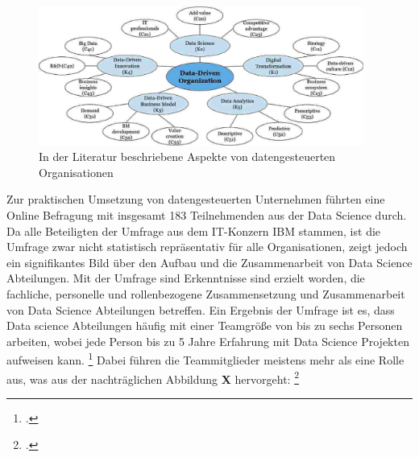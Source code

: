 \begin{figure}[htb]
    \centering
    \includegraphics[width=0.95\textwidth]{graphics/ddo aspects.png}
    \caption{In der Literatur beschriebene Aspekte von datengesteuerten Organisationen}
    \label{fig:DDOs aspects}
\end{figure}

Zur praktischen Umsetzung von datengesteuerten Unternehmen führten  eine Online Befragung mit insgesamt 183 Teilnehmenden aus der Data Science durch.
Da alle Beteiligten der Umfrage aus dem IT-Konzern IBM stammen, ist die Umfrage zwar nicht statistisch repräsentativ für alle Organisationen, zeigt jedoch ein signifikantes Bild über den Aufbau und die Zusammenarbeit von Data Science Abteilungen.
Mit der Umfrage sind Erkenntnisse sind erzielt worden, die fachliche, personelle und rollenbezogene Zusammensetzung und Zusammenarbeit von Data Science Abteilungen betreffen.
Ein Ergebnis der Umfrage ist es, dass Data science Abteilungen häufig mit einer Teamgröße von bis zu sechs Personen arbeiten, wobei jede Person bis zu 5 Jahre Erfahrung mit Data Science Projekten aufweisen kann. \footcite[prenote][postnote]{(histogram of data science)}
Dabei führen die Teammitglieder meistens mehr als eine Rolle aus, was aus der nachträglichen Abbildung \textbf{X} hervorgeht: \footcite[prenote][postnote]{(histogram2x of data science)}

